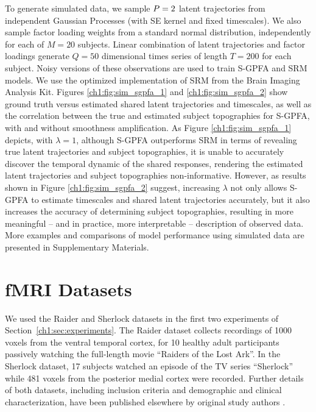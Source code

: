 To generate simulated data, we sample $P = 2$ latent trajectories from independent Gaussian Processes (with SE kernel and fixed timescales). We also sample factor loading weights from a standard normal distribution, independently for each of $M=20$ subjects. Linear combination of latent trajectories and factor loadings generate $Q = 50$ dimensional times series of length $T = 200$ for each subject. Noisy versions of these observations are used to train S-GPFA and SRM models. We use the optimized implementation of SRM \cite{srm_enabling} from the Brain Imaging Analysis Kit.
Figures \ref{ch1:fig:sim_sgpfa_1} and \ref{ch1:fig:sim_sgpfa_2} show ground truth versus estimated shared latent trajectories and timescales, as well as the correlation between the true and estimated subject topographies for S-GPFA, with and without smoothness amplification. As Figure \ref{ch1:fig:sim_sgpfa_1} depicts, with $\lambda=1$, although S-GPFA outperforms SRM in terms of revealing true latent trajectories and subject topographies, it is unable to accurately discover the temporal dynamic of the shared responses, rendering the estimated latent trajectories and subject topographies non-informative. However, as results shown in Figure \ref{ch1:fig:sim_sgpfa_2} suggest, increasing $\lambda$ not only allows S-GPFA to estimate timescales and shared latent trajectories accurately, but it also increases the accuracy of determining subject topographies, resulting in more meaningful -- and in practice, more interpretable -- description of observed data. More examples and comparisons of model performance using simulated data are presented in Supplementary Materials.

\section{fMRI Datasets}

We used the Raider \cite{ha} and Sherlock \cite{sherlock} datasets in the first two experiments of Section~\ref{ch1:sec:experiments}. The Raider dataset collects recordings of 1000 voxels from the ventral temporal cortex, for 10 healthy adult participants passively watching the full-length movie ``Raiders of the Lost Ark''. In the Sherlock dataset, 17 subjects watched an episode of the TV series ``Sherlock'' while 481 voxels from the posterior medial cortex were recorded. Further details of both datasets, including inclusion criteria and demographic and clinical characterization, have been published elsewhere by original study authors \cite{ha, sherlock}.

